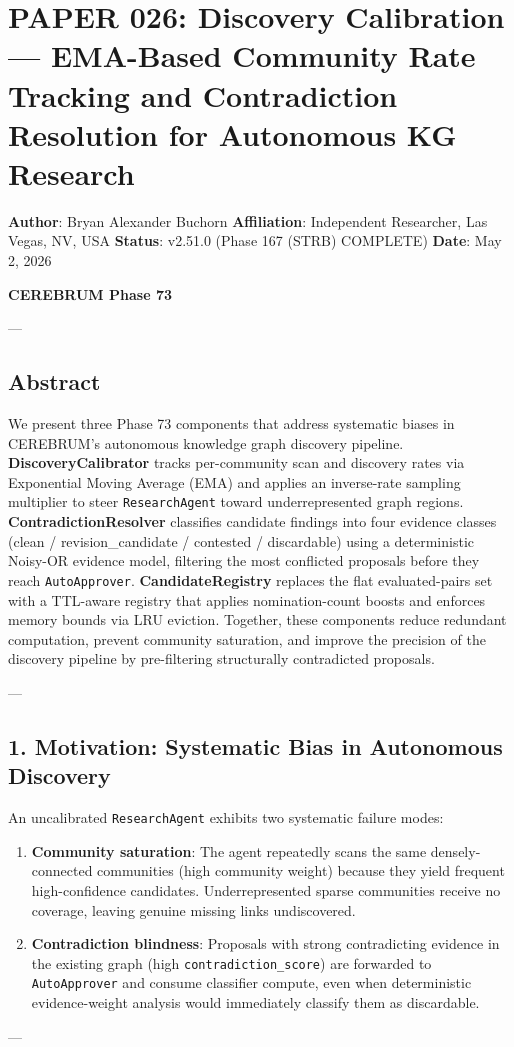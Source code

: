 \section{PAPER 026: Discovery Calibration — EMA-Based Community Rate Tracking and Contra\-diction Resolution for Autonomous KG Research}

\textbf{Author}: Bryan Alexander Buchorn  
\textbf{Affiliation}: Independent Researcher, Las Vegas, NV, USA  
\textbf{Status}: v2.51.0 (Phase 167 (STRB) COMPLETE)
\textbf{Date}: May 2, 2026

\textbf{CEREBRUM Phase 73}

---

\subsection{Abstract}

We present three Phase 73 components that address systematic biases in CEREBRUM's autonomous knowledge graph discovery pipeline. \textbf{DiscoveryCalibrator} tracks per-community scan and discovery rates via Exponential Moving Average (EMA) and applies an inverse-rate sampling multiplier to steer \texttt{ResearchAgent} toward under\-represented graph regions. \textbf{Contra\-dictionResolver} classifies candidate findings into four evidence classes (clean / revision\_candidate / contested / discardable) using a deter\-ministic Noisy-OR evidence model, filtering the most conflicted proposals before they reach \texttt{AutoApprover}. \textbf{CandidateRegistry} replaces the flat evaluated-pairs set with a TTL-aware registry that applies nomination-count boosts and enforces memory bounds via LRU eviction. Together, these components reduce redundant computation, prevent community saturation, and improve the precision of the discovery pipeline by pre-filtering struc\-turally contr\-adicted proposals.

---

\subsection{1. Motivation: Systematic Bias in Autonomous Discovery}

An uncal\-ibrated \texttt{ResearchAgent} exhibits two systematic failure modes:

\begin{enumerate}
\item \textbf{Community saturation}: The agent repeatedly scans the same densely-connected communities (high community weight) because they yield frequent high-confidence candidates. Underr\-epresented sparse communities receive no coverage, leaving genuine missing links undis\-covered.

\item \textbf{Contra\-diction blindness}: Proposals with strong contr\-adicting evidence in the existing graph (high \texttt{contradiction\_score}) are forwarded to \texttt{AutoApprover} and consume classifier compute, even when deter\-ministic evidence-weight analysis would immediately classify them as discardable.

\end{enumerate}
---

